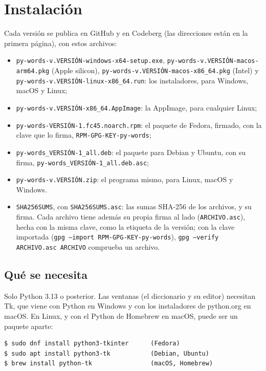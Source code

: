 \documentclass[12pt,
              article,
              oneside
              ]{memoir}
\begin{document}
\section{Instalación}
\label{sec:install}

Cada versión se publica en GitHub y en Codeberg (las direcciones están en
la primera página), con estos archivos:

%
\begin{itemize}
\item \texttt{py-words-v.VERSIÓN-windows-x64-setup.exe},
  \texttt{py-words-v.VERSIÓN-macos-arm64.pkg} (Apple silicon),
  \texttt{py-words-v.VERSIÓN-macos-x86\_64.pkg} (Intel) y
  \texttt{py-words-v.VERSIÓN-linux-x86\_64.run}: los instaladores, para
  Windows, macOS y Linux;
\item \texttt{py-words-v.VERSIÓN-x86\_64.AppImage}: la AppImage, para
  cualquier Linux;
\item \texttt{py-words-VERSIÓN-1.fc45.noarch.rpm}: el paquete de Fedora,
  firmado, con la clave que lo firma, \texttt{RPM-GPG-KEY-py-words};
\item \texttt{py-words\_VERSIÓN-1\_all.deb}: el paquete para Debian y
  Ubuntu, con su firma, \texttt{py-words\_VERSIÓN-1\_all.deb.asc};
\item \texttt{py-words-v.VERSIÓN.zip}: el programa mismo, para Linux,
  macOS y Windows.
\item \texttt{SHA256SUMS}, con \texttt{SHA256SUMS.asc}: las sumas SHA-256 de
  los archivos, y su firma. Cada archivo tiene además su propia firma al
  lado (\texttt{ARCHIVO.asc}), hecha con la misma clave, como la etiqueta de
  la versión; con la clave importada (\texttt{gpg --import
  RPM-GPG-KEY-py-words}), \texttt{gpg --verify ARCHIVO.asc ARCHIVO} comprueba
  un archivo.
\end{itemize}

\subsection{Qué se necesita}

%
Solo Python 3.13 o posterior. Las ventanas (el diccionario y su editor)
necesitan Tk, que viene con Python en Windows y con los instaladores de
python.org en macOS. En Linux, y con el Python de Homebrew en macOS, puede
ser un paquete aparte:

\begin{verbatim}
$ sudo dnf install python3-tkinter      (Fedora)
$ sudo apt install python3-tk           (Debian, Ubuntu)
$ brew install python-tk                (macOS, Homebrew)
\end{verbatim}
\end{document}
